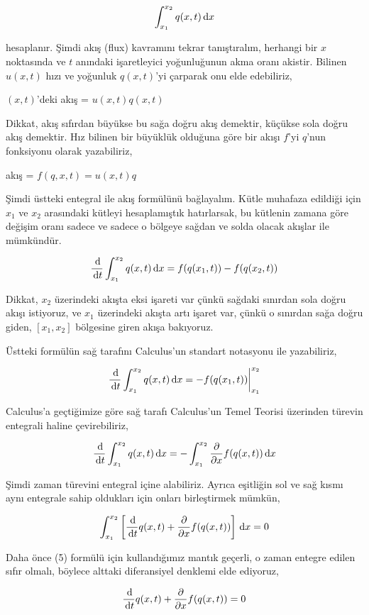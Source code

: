 \documentclass[12pt,fleqn]{article}\usepackage{../../common}
\begin{document}
$$
\int _{x_1}^{x_2} q(x,t) \,\mathrm{d} x
$$

hesaplanır. Şimdi akış (flux) kavramını tekrar tanıştıralım, herhangi bir $x$
noktasında ve $t$ anındaki işaretleyici yoğunluğunun akma oranı akistir.
Bilinen $u(x,t)$ hızı ve yoğunluk $q(x,t)$'yi çarparak onu elde edebiliriz,

$(x,t)$'deki akış  = $u(x,t) q(x,t)$

Dikkat, akış sıfırdan büyükse bu sağa doğru akış demektir, küçükse sola doğru
akış demektir. Hız bilinen bir büyüklük olduğuna göre bir akışı $f$'yi $q$'nun
fonksiyonu olarak yazabiliriz,

akış = $f(q,x,t) = u(x,t) q$ 

Şimdi üstteki entegral ile akış formülünü bağlayalım. Kütle muhafaza edildiği
için $x_1$ ve $x_2$ arasındaki kütleyi hesaplamıştık hatırlarsak, bu kütlenin
zamana göre değişim oranı sadece ve sadece o bölgeye sağdan ve solda olacak
akışlar ile mümkündür.

$$
\frac{\,\mathrm{d}}{\,\mathrm{d} t} \int _{x_1}^{x_2} q(x,t) \,\mathrm{d} x =
f(q(x_1,t)) - f(q(x_2,t)) 
$$

Dikkat, $x_2$ üzerindeki akışta eksi işareti var çünkü sağdaki sınırdan
sola doğru akışı istiyoruz, ve $x_1$ üzerindeki akışta artı işaret var,
çünkü o sınırdan sağa doğru giden, $[x_1,x_2]$ bölgesine giren akışa
bakıyoruz.

Üstteki formülün sağ tarafını Calculus'un standart notasyonu ile yazabiliriz,

$$
\frac{\,\mathrm{d}}{\,\mathrm{d} t} \int _{x_1}^{x_2} q(x,t) \,\mathrm{d} x =
-f(q(x_1,t)) \biggr\rvert_{x_1}^{x_2}
$$

Calculus'a geçtiğimize göre sağ tarafı Calculus'un Temel Teorisi üzerinden
türevin entegrali haline çevirebiliriz,

$$
\frac{\,\mathrm{d}}{\,\mathrm{d} t} \int _{x_1}^{x_2} q(x,t) \,\mathrm{d} x =
- \int_{x_1}^{x_2} \frac{\partial }{\partial x} f(q(x,t)) \,\mathrm{d} x
$$

Şimdi zaman türevini entegral içine alabiliriz. Ayrıca eşitliğin sol ve sağ
kısmı aynı entegrale sahip oldukları için onları birleştirmek mümkün,

$$
\int _{x_1}^{x_2}
\left[
\frac{\,\mathrm{d}}{\,\mathrm{d} t} q(x,t) + \frac{\partial }{\partial x} f(q(x,t)) 
\right]
\,\mathrm{d} x  = 0
$$

Daha önce (5) formülü için kullandığımız mantık geçerli, o zaman entegre
edilen sıfır olmalı, böylece alttaki diferansiyel denklemi elde ediyoruz,

$$
\frac{\,\mathrm{d}}{\,\mathrm{d} t} q(x,t) + \frac{\partial }{\partial x} f(q(x,t))  = 0
$$
\end{document}
